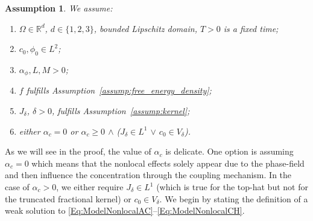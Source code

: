 \documentclass[]{article}
\newtheorem{assumption}{Assumption}
\newcommand{\R}{\mathbb{R}}
\begin{document}
\begin{assumption} \label{assumption}
	We assume:\\[-0.5em]
	\begin{enumerate}[label=(A\arabic*), ref=A\arabic*, leftmargin=.9cm,itemsep=0em]
		\item $\Omega \in \R^d$, $d \in \{1,2,3\}$, bounded Lipschitz domain, $T>0$ is a fixed time;
		\item $c_0,\phi_0 \in L^2$;
		\item $\alpha_\phi,L,M>0$;
		\item $f$ fulfills Assumption~\ref{assump:free_energy_density};
		\item $J_\delta$, $\delta>0$, fulfills Assumption~\ref{assump:kernel};
		\item either $\alpha_c=0$ or $\alpha_c \geq 0$ $\wedge$ ($J_\delta \in L^1$ $\vee$ $c_0 \in V_\delta$).
	\end{enumerate}
\end{assumption}
As we will see in the proof, the value of $\alpha_c$ is delicate. One option is assuming $\alpha_c=0$ which means that the nonlocal effects solely appear due to the phase-field and then influence the concentration through the coupling mechanism. In the case of $\alpha_c>0$, we either require $J_\delta \in L^1$ (which is true for the top-hat but not for the truncated fractional kernel) or $c_0 \in V_\delta$. We begin by stating the definition of a weak solution to \eqref{Eq:ModelNonlocalAC}--\eqref{Eq:ModelNonlocalCH}. 
\end{document}
